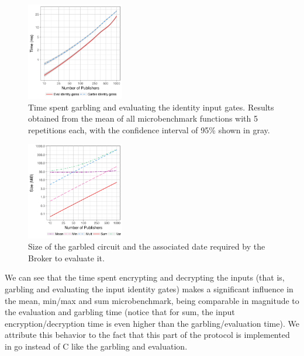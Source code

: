 \begin{figure}
  \includegraphics[width=0.38\textwidth]{plots/enc_dec.png}
  \caption{Time spent garbling and evaluating the identity input gates.
    Results obtained from the mean of all microbenchmark functions with 5
    repetitions each, with the confidence interval of 95\% shown in gray.}
  \label{micro-inputs}
\end{figure}



\begin{figure}
  \includegraphics[width=0.38\textwidth]{plots/size_log.png}
  \caption{Size of the garbled circuit and the associated date required by the
    Broker to evaluate it.}
  \label{micro-sizes}
\end{figure}

We can see that the time spent encrypting and decrypting the inputs (that is,
garbling and evaluating the input identity gates) makes a significant influence
in the mean, min/max and sum microbenchmark, being comparable in magnitude to
the evaluation and garbling time (notice that for sum, the input
encryption/decryption time is even higher than the garbling/evaluation time).
We attribute this behavior to the fact that this part of the protocol is
implemented in go instead of C like the garbling and evaluation.


